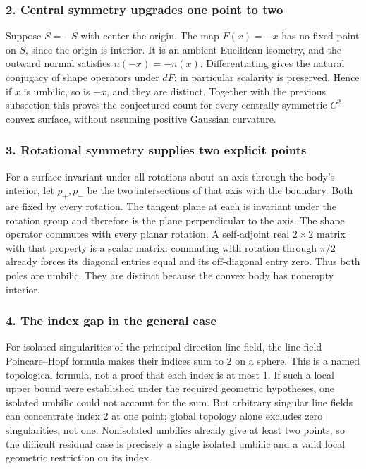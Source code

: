 \documentclass[11pt,a4paper]{article}
\begin{document}
\subsubsection{2. Central symmetry upgrades one point to two}
Suppose $S=-S$ with center the origin. The map $F(x)=-x$ has no fixed point on $S$, since the origin is interior. It is an ambient Euclidean isometry, and the outward normal satisfies $n(-x)=-n(x)$. Differentiating gives the natural conjugacy of shape operators under $dF$; in particular scalarity is preserved. Hence if $x$ is umbilic, so is $-x$, and they are distinct. Together with the previous subsection this proves the conjectured count for every centrally symmetric $C^2$ convex surface, without assuming positive Gaussian curvature.

\subsubsection{3. Rotational symmetry supplies two explicit points}
For a surface invariant under all rotations about an axis through the body's interior, let $p_+,p_-$ be the two intersections of that axis with the boundary. Both are fixed by every rotation. The tangent plane at each is invariant under the rotation group and therefore is the plane perpendicular to the axis. The shape operator commutes with every planar rotation. A self-adjoint real $2\times2$ matrix with that property is a scalar matrix: commuting with rotation through $\pi/2$ already forces its diagonal entries equal and its off-diagonal entry zero. Thus both poles are umbilic. They are distinct because the convex body has nonempty interior.

\subsubsection{4. The index gap in the general case}
For isolated singularities of the principal-direction line field, the line-field Poincare--Hopf formula makes their indices sum to 2 on a sphere. This is a named topological formula, not a proof that each index is at most 1. If such a local upper bound were established under the required geometric hypotheses, one isolated umbilic could not account for the sum. But arbitrary singular line fields can concentrate index 2 at one point; global topology alone excludes zero singularities, not one. Nonisolated umbilics already give at least two points, so the difficult residual case is precisely a single isolated umbilic and a valid local geometric restriction on its index.
\end{document}
